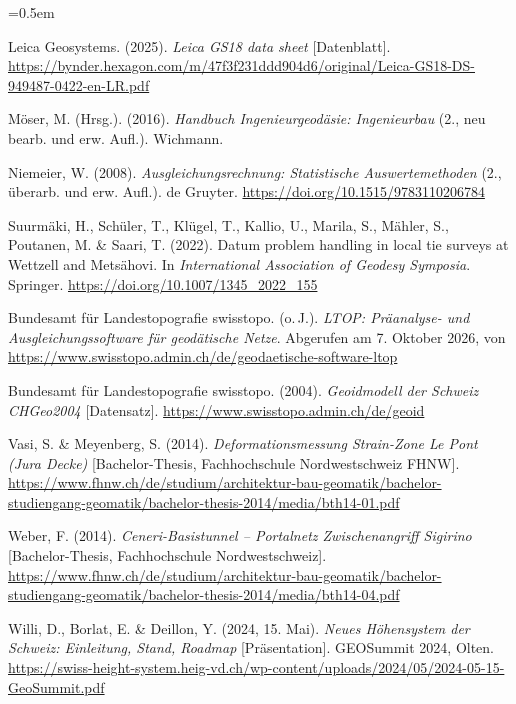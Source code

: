 \begin{list}{}{\leftmargin=1.27cm \itemindent=-1.27cm \itemsep=0.5em}
\item Leica Geosystems. (2025). \textit{Leica GS18 data sheet} [Datenblatt]. \url{https://bynder.hexagon.com/m/47f3f231ddd904d6/original/Leica-GS18-DS-949487-0422-en-LR.pdf}

\item Möser, M. (Hrsg.). (2016). \textit{Handbuch Ingenieurgeodäsie: Ingenieurbau} (2., neu bearb. und erw. Aufl.). Wichmann.

\item Niemeier, W. (2008). \textit{Ausgleichungsrechnung: Statistische Auswertemethoden} (2., überarb. und erw. Aufl.). de Gruyter. \url{https://doi.org/10.1515/9783110206784}

\item Suurmäki, H., Schüler, T., Klügel, T., Kallio, U., Marila, S., Mähler, S., Poutanen, M. \& Saari, T. (2022). Datum problem handling in local tie surveys at Wettzell and Metsähovi. In \textit{International Association of Geodesy Symposia}. Springer. \url{https://doi.org/10.1007/1345_2022_155}

\item Bundesamt für Landestopografie swisstopo. (o.\,J.). \textit{LTOP: Präanalyse- und Ausgleichungssoftware für geodätische Netze}. Abgerufen am 7. Oktober 2026, von \url{https://www.swisstopo.admin.ch/de/geodaetische-software-ltop}

\item Bundesamt für Landestopografie swisstopo. (2004). \textit{Geoidmodell der Schweiz CHGeo2004} [Datensatz]. \url{https://www.swisstopo.admin.ch/de/geoid}

\item Vasi, S. \& Meyenberg, S. (2014). \textit{Deformationsmessung Strain-Zone Le Pont (Jura Decke)} [Bachelor-Thesis, Fachhochschule Nordwestschweiz FHNW]. \url{https://www.fhnw.ch/de/studium/architektur-bau-geomatik/bachelor-studiengang-geomatik/bachelor-thesis-2014/media/bth14-01.pdf}

\item Weber, F. (2014). \textit{Ceneri-Basistunnel -- Portalnetz Zwischenangriff Sigirino} [Bachelor-Thesis, Fachhochschule Nordwestschweiz]. \url{https://www.fhnw.ch/de/studium/architektur-bau-geomatik/bachelor-studiengang-geomatik/bachelor-thesis-2014/media/bth14-04.pdf}

\item Willi, D., Borlat, E. \& Deillon, Y. (2024, 15. Mai). \textit{Neues Höhensystem der Schweiz: Einleitung, Stand, Roadmap} [Präsentation]. GEOSummit 2024, Olten. \url{https://swiss-height-system.heig-vd.ch/wp-content/uploads/2024/05/2024-05-15-GeoSummit.pdf}


\end{list}
